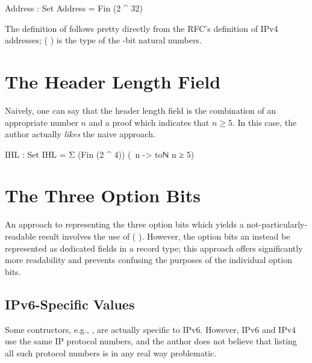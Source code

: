\documentclass{report}
\begin{document}
\begin{itemize}
\begin{code}
  Address : Set
  Address = Fin (2 ^ 32)
\end{code}

The definition of  follows pretty directly from the RFC's definition of IPv4 addresses;  \AgdaSymbol( \AgdaOperator{\AgdaFunction{^}} \AgdaSymbol) is the type of the -bit natural numbers.

\section{The Header Length Field}
Naively, one can say that the header length field is the combination of an appropriate  number \(n\) and a proof which indicates that \(n \geq 5\).  In this case, the author actually \emph{likes} the naive approach.

\begin{code}
  IHL : Set
  IHL = Σ (Fin (2 ^ 4)) (\ n -> toℕ n ≥ 5)
\end{code}

\section{The Three Option Bits}
An approach to representing the three option bits which yields a not-particularly-readable result involves the use of  \AgdaSymbol( \AgdaOperator{\AgdaFunction{\circumflex}} \AgdaSymbol).  However, the option bits an instead be represented as dedicated  fields in a record type; this approach offers significantly more readability and prevents confusing the purposes of the individual option bits.

\subsection{IPv6-Specific Values}
Some  contructors, e.g., , are actually specific to IPv6.  However, IPv6 and IPv4 use the same IP protocol numbers, and the author does not believe that listing all such protocol numbers is in any real way problematic.


\end{itemize}
\end{document}
